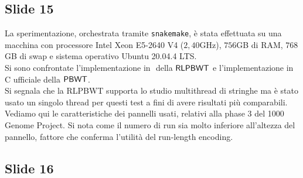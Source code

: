 \documentclass[a4paper,11pt, oneside,italian]{article}
\def\PBWT{\mbox{\rm {\sf PBWT}}}
\def\RLPBWT{\mbox{\rm {\sf RLPBWT}}}
\begin{document}
\subsection*{Slide 15}
La sperimentazione, orchestrata tramite \texttt{snakemake}, è stata
effettuata su una macchina con processore 
Intel Xeon E5-2640 V4 ($2,40$GHz), $756$GB di RAM, $768$GB di swap e
sistema operativo Ubuntu 20.04.4 LTS.\\
Si sono confrontate l'implementazione in \Cplusplus $\,\,$della $\RLPBWT$ e
l'implementazione in C ufficiale della $\PBWT$.\\
Si segnala che la RLPBWT supporta lo studio multithread di stringhe ma è stato
usato un singolo thread per questi test a fini di avere risultati più
comparabili.\\
Vediamo qui le caratteristiche dei pannelli usati, relativi alla phase 3 del
1000 Genome Project. Si nota come il numero di run sia molto inferiore
all'altezza del pannello, fattore che conferma l'utilità del run-length
encoding.
\subsection*{Slide 16}
\end{document}
